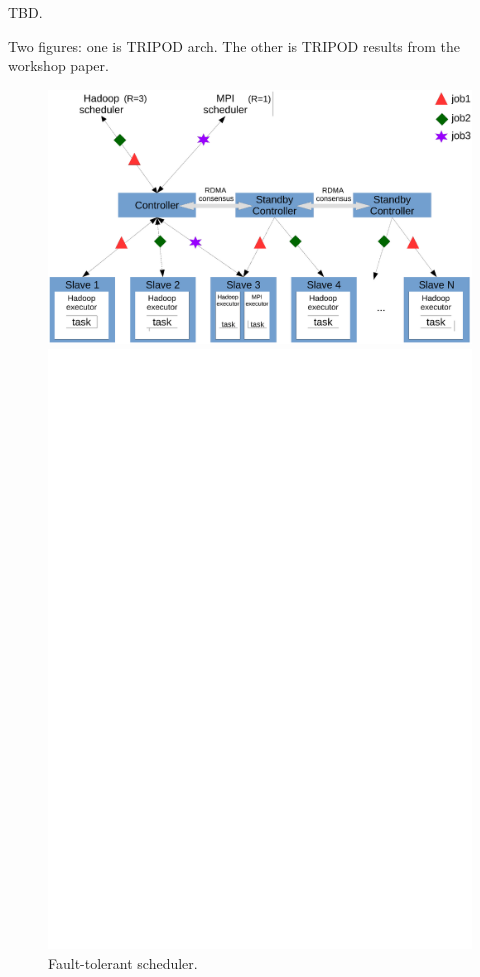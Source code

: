 TBD.

Two figures: one is TRIPOD arch. The other is TRIPOD results from the workshop 
paper.

\begin{figure}[!htb]
    \begin{minipage}{.49\textwidth}
        \includegraphics[width=0.34\textheight]{figures/scheduler_arch.ps}
        \vspace{0.1in}
        \caption{Fault-tolerant scheduler.}
        \label{fig:falcon-arch}
    \end{minipage}
    \begin{minipage}{0.51\textwidth}
        \includegraphics[width=0.34\textheight]{figures/scheduler_flow.ps}

\end{minipage}
\end{figure}
